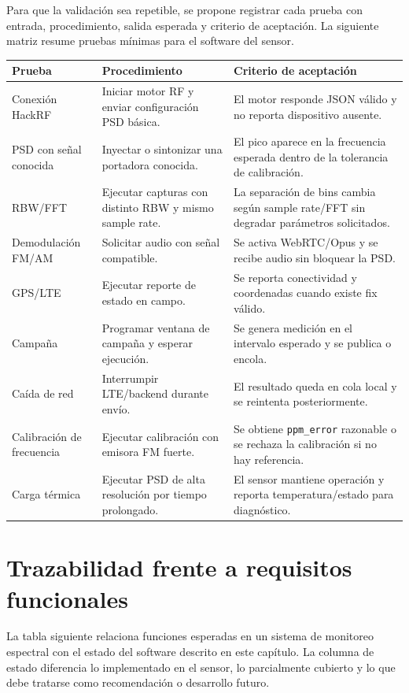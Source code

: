 Para que la validación sea repetible, se propone registrar cada prueba con entrada,
procedimiento, salida esperada y criterio de aceptación. La siguiente matriz
resume pruebas mínimas para el software del sensor.

\begin{longtable}{p{}p{}p{}}
\toprule
\textbf{Prueba} & \textbf{Procedimiento} & \textbf{Criterio de aceptación} \\
\midrule
\endhead
Conexión HackRF & Iniciar motor RF y enviar configuración PSD básica. & El motor responde JSON válido y no reporta dispositivo ausente. \\
PSD con señal conocida & Inyectar o sintonizar una portadora conocida. & El pico aparece en la frecuencia esperada dentro de la tolerancia de calibración. \\
RBW/FFT & Ejecutar capturas con distinto RBW y mismo sample rate. & La separación de bins cambia según sample rate/FFT sin degradar parámetros solicitados. \\
Demodulación FM/AM & Solicitar audio con señal compatible. & Se activa WebRTC/Opus y se recibe audio sin bloquear la PSD. \\
GPS/LTE & Ejecutar reporte de estado en campo. & Se reporta conectividad y coordenadas cuando existe fix válido. \\
Campaña & Programar ventana de campaña y esperar ejecución. & Se genera medición en el intervalo esperado y se publica o encola. \\
Caída de red & Interrumpir LTE/backend durante envío. & El resultado queda en cola local y se reintenta posteriormente. \\
Calibración de frecuencia & Ejecutar calibración con emisora FM fuerte. & Se obtiene \texttt{ppm\_error} razonable o se rechaza la calibración si no hay referencia. \\
Carga térmica & Ejecutar PSD de alta resolución por tiempo prolongado. & El sensor mantiene operación y reporta temperatura/estado para diagnóstico. \\
\bottomrule
\end{longtable}

\section{Trazabilidad frente a requisitos funcionales}

La tabla siguiente relaciona funciones esperadas en un sistema de monitoreo
espectral con el estado del software descrito en este capítulo. La columna de
estado diferencia lo implementado en el sensor, lo parcialmente cubierto y lo que
debe tratarse como recomendación o desarrollo futuro.

